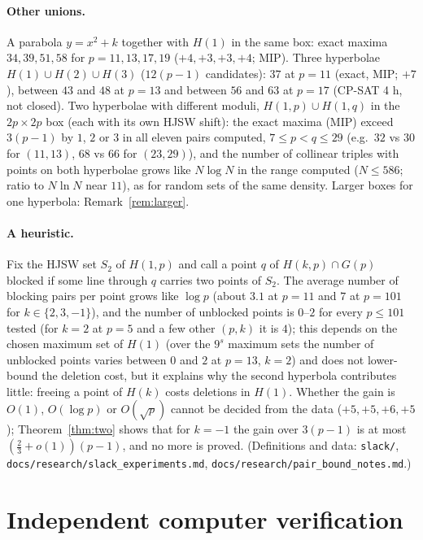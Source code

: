\documentclass[11pt]{article}
\theoremstyle{remark}
\newcommand{\Gp}{G(p)}
\begin{document}
\paragraph{Other unions.}  A parabola $y=x^2+k$ together with $H(1)$ in the same box: exact maxima $34,39,51,58$ for
$p=11,13,17,19$ ($+4,+3,+3,+4$; MIP).  Three hyperbolae $H(1)\cup H(2)\cup H(3)$ ($12(p-1)$ candidates): $37$ at $p=11$ (exact, MIP;
$+7$), between $43$ and $48$ at $p=13$ and between $56$ and $63$ at $p=17$ (CP-SAT 4 h, not closed).  Two hyperbolae with different
moduli, $H(1,p)\cup H(1,q)$ in the $2p\times2p$ box (each with its own HJSW shift): the exact maxima (MIP) exceed $3(p-1)$ by $1$, $2$ or
$3$ in all eleven pairs computed, $7\le p<q\le29$ (e.g.\ $32$ vs $30$ for $(11,13)$, $68$ vs $66$ for $(23,29)$), and the number of
collinear triples with points on both hyperbolae grows like $N\log N$ in the range computed ($N\le586$; ratio to $N\ln N$ near $11$),
as for random sets of the same density.  Larger boxes for one hyperbola: Remark~\ref{rem:larger}.

\paragraph{A heuristic.}  Fix the HJSW set $S_2$ of $H(1,p)$ and call a point $q$ of $H(k,p)\cap\Gp$ blocked if some line through $q$
carries two points of $S_2$.  The average number of blocking pairs per point grows like $\log p$ (about $3.1$ at $p=11$ and $7$ at
$p=101$ for $k\in\{2,3,-1\}$), and the number of unblocked points is $0$--$2$ for every $p\le101$ tested (for $k=2$ at $p=5$ and a few
other $(p,k)$ it is $4$); this depends on the chosen maximum set of $H(1)$ (over the $9^s$ maximum sets the number of unblocked points
varies between $0$ and $2$ at $p=13$, $k=2$) and does not lower-bound the deletion cost, but it explains why the second hyperbola
contributes little: freeing a point of $H(k)$ costs deletions in $H(1)$.  Whether the gain is $O(1)$, $O(\log p)$ or $O(\sqrt p)$
cannot be decided from the data ($+5,+5,+6,+5$); Theorem~\ref{thm:two} shows that for $k=-1$ the gain over $3(p-1)$ is at most
$(\tfrac23+o(1))(p-1)$, and no more is proved.  (Definitions and data: \texttt{slack/}, \texttt{docs/research/slack\_experiments.md},
\texttt{docs/research/pair\_bound\_notes.md}.)

\section{Independent computer verification}
\end{document}
